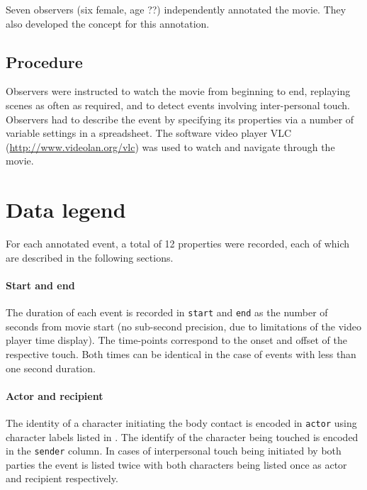 \documentclass[10pt,a4paper,twocolumn]{article}
\begin{document}
Seven observers (six female, age ??) independently annotated the movie. They
also developed the concept for this annotation.

\subsection*{Procedure} %
Observers were instructed to watch the movie from beginning to end, replaying
scenes as often as required, and to detect events involving inter-personal touch.
Observers had to describe the event by specifying its
properties via a number of variable settings in a spreadsheet. The software
video player VLC (\url{http://www.videolan.org/vlc}) was used to watch and
navigate through the movie.


\section*{Data legend}

For each annotated event, a total of 12 properties were recorded, each of which
are described in the following sections.

\paragraph{Start and end} The duration of each event is recorded in
\texttt{start} and \texttt{end} as the number of seconds from movie start (no
sub-second precision, due to limitations of the video player time display). The
time-points correspond to the onset and offset of the respective touch. Both
times can be identical in the case of events with less than one second duration.

\paragraph{Actor and recipient} The identity of a character initiating the body 
contact is encoded in \texttt{actor} using character labels listed in \citep{LRS+2015}.
The identify of the character being touched is encoded in the \texttt{sender} column.
In cases of interpersonal touch being initiated by both parties the event is listed twice with both characters being listed once as actor and recipient respectively.
\end{document}
